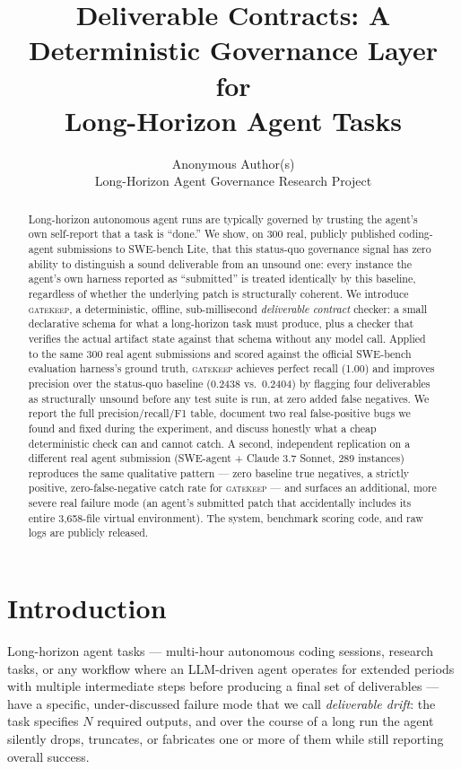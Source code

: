 \documentclass{article}
\title{Deliverable Contracts: A Deterministic Governance Layer for\\
Long-Horizon Agent Tasks}
\author{
  Anonymous Author(s) \\
  Long-Horizon Agent Governance Research Project
}
\begin{document}
\maketitle

\begin{abstract}
Long-horizon autonomous agent runs are typically governed by trusting the
agent's own self-report that a task is ``done.'' We show, on 300 real,
publicly published coding-agent submissions to SWE-bench Lite, that this
status-quo governance signal has zero ability to distinguish a sound
deliverable from an unsound one: every instance the agent's own harness
reported as ``submitted'' is treated identically by this baseline,
regardless of whether the underlying patch is structurally coherent. We
introduce \textsc{gatekeep}, a deterministic, offline, sub-millisecond
\emph{deliverable contract} checker: a small declarative schema for what a
long-horizon task must produce, plus a checker that verifies the actual
artifact state against that schema without any model call. Applied to the
same 300 real agent submissions and scored against the official
SWE-bench evaluation harness's ground truth, \textsc{gatekeep} achieves
perfect recall (1.00) and improves precision over the status-quo baseline
(0.2438 vs.\ 0.2404) by flagging four deliverables as structurally
unsound before any test suite is run, at zero added false negatives.
We report the full precision/recall/F1 table, document two real
false-positive bugs we found and fixed during the experiment, and discuss
honestly what a cheap deterministic check can and cannot catch. A second,
independent replication on a different real agent submission (SWE-agent +
Claude 3.7 Sonnet, 289 instances) reproduces the same qualitative pattern
--- zero baseline true negatives, a strictly positive, zero-false-negative
catch rate for \textsc{gatekeep} --- and surfaces an additional, more
severe real failure mode (an agent's submitted patch that accidentally
includes its entire 3{,}658-file virtual environment). The system,
benchmark scoring code, and raw logs are publicly released.
\end{abstract}

\section{Introduction}

Long-horizon agent tasks --- multi-hour autonomous coding sessions,
research tasks, or any workflow where an LLM-driven agent operates for
extended periods with multiple intermediate steps before producing a final
set of deliverables --- have a specific, under-discussed failure mode that
we call \emph{deliverable drift}: the task specifies $N$ required outputs,
and over the course of a long run the agent silently drops, truncates, or
fabricates one or more of them while still reporting overall success.
\end{document}
